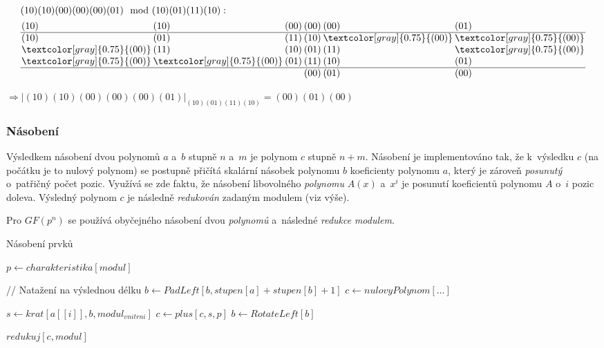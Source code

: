 \documentclass[thesis=M,czech,hidelinks]{FITthesis}[2012/06/26]
\newcommand{\0}{{\textcolor[gray]{0.75}{0}}}
\newenvironment{algoritmus}{
    \floatname{algorithm}{Algoritmus}
    \begin{algorithm}
}{\end{algorithm}}
\begin{document}
\renewcommand{\0}{{\textcolor[gray]{0.75}{(00)}}}
\begin{align*}
&(10)(10)(00)(00)(00)(01) \mod (10)(01)(11)(10) : \\
& \arraycolsep=1pt
\begin{array}{*{6}{l}}
        (10) & (10) & (00) & (00) & (00) & (01) \\
    \hline
        (10) & (01) & (11) & (10) &  \0  &  \0  \\
         \0  & (11) & (10) & (01) & (11) &  \0  \\
         \0  &  \0  & (01) & (11) & (10) & (01) \\
    \hline
             &      &      & (00) & (01) & (00) \\
\end{array}
\end{align*}

$
    \Rightarrow
    \left| (10)(10)(00)(00)(00)(01) \right|_{(10)(01)(11)(10)} = (00)(01)(00)
$


\subsubsection{Násobení}

Výsledkem násobení dvou polynomů $a$ a~$b$ stupně $n$ a~$m$ je polynom $c$
stupně $n+m$. Násobení je implementováno tak, že k~výsledku $c$ (na počátku je
to nulový polynom) se postupně přičítá skalární násobek polynomu $b$ koeficienty
polynomu $a$, který je zároveň \emph{posunutý} o~patřičný počet pozic. Využívá
se zde faktu, že násobení libovolného \emph{polynomu} $A(x)$ a~$x^i$ je posunutí
koeficientů polynomu $A$ o~$i$ pozic doleva. Výsledný polynom $c$ je následně
\emph{redukován} zadaným modulem (viz výše).

Pro $GF(p^n)$ se používá obyčejného násobení dvou \emph{polynomů} a~následné
\emph{redukce} \emph{modulem}.

\begin{algoritmus}[!ht]
    \caption{Násobení prvků}
    \begin{algorithmic}[1]
        \State $ p \gets charakteristika[ modul ] $

        // Natažení na výslednou délku
        \State $ b \gets PadLeft[ b, stupen[a] + stupen[b] + 1 ] $
        \State $ c \gets nulovyPolynom[\ldots ] $

        \hfil
            \State $ s \gets krat[ a[[i]], b, modul_{vnitrni} ] $
            \State $ c \gets plus[ c, s, p ] $
            \State $ b \gets RotateLeft[b] $
        \EndFor

        \hfil
        \State \Return $redukuj[c,modul]$
     \EndFunction
    \end{algorithmic}
\end{algoritmus}
\end{document}
